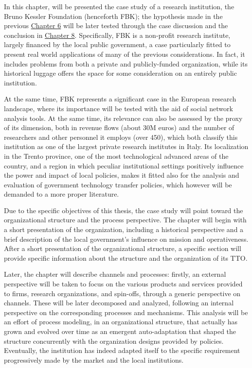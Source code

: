 

\label{Chapter7}

In this chapter, will be presented the case study of a research institution, the Bruno Kessler Foundation (henceforth FBK); the hypothesis made in the previous \hyperref[Chapter6]{Chapter 6} will be later tested through the case discussion and the conclusion in \hyperref[Chapter8]{Chapter 8}. Specifically, FBK is a non-profit research institute, largely financed by the local public government, a case particularly fitted to present real world applications of many of the previous considerations. In fact, it includes problems from both a private and publicly-funded organization, while its historical luggage offers the space for some consideration on an entirely public institution. 

At the same time, FBK represents a significant case in the European research landscape, where its importance will be tested with the aid of social network analysis tools. At the same time, its relevance can also be assessed by the proxy of its dimension, both in revenue flows (about 30M euros) and the number of researchers and other personnel it employs (over 450), which both classify this institution as one of the largest private research institutes in Italy. Its localization in the Trento province, one of the most technological advanced areas of the country, and a region in which peculiar institutional settings positively influence the power and impact of local policies, makes it fitted also for the analysis and evaluation of government technology transfer policies, which however will be demanded to a more proper literature.

Due to the specific objectives of this thesis, the case study will point toward the organizational structure and the process perspective. The chapter will begin with a short presentation of the organization, including a historical perspective and a brief description of the local government's influence on mission and operativeness. After a short presentation of the organizational structure, a specific section will provide specific information about the structure and the organization of its TTO.

Later, the chapter will describe channels and processes: firstly, an external perspective will be taken to focus on the various products and services provided to firms, research organizations, and spin-offs, through a generic perspective on channels. These will be later decomposed and analyzed, following an internal perspective on the corresponding processes and mechanisms. This analysis will be an effort of process modeling, in an organizational structure, that actually has grown and evolved over time as an emergent auto-adaptation that shaped the structure concurrently with the organization designs provided by policies. Eventually, the institution has indeed adapted itself to the specific requirement progressively made by the market and the local institutions. 

